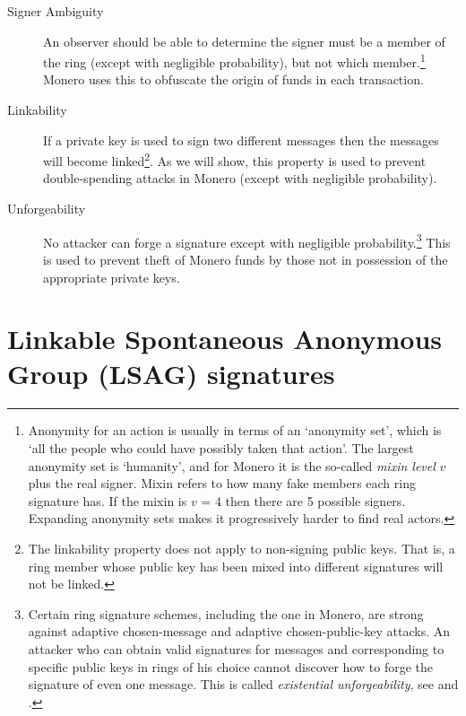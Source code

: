 \begin{description}
	
	\item[Signer Ambiguity]
	An observer should be able to determine the signer must be a member of the ring (except with negligible probability), but not which member.\footnote{\label{anonymity_note}Anonymity for an action is usually in terms of an `anonymity set’, which is `all the people who could have possibly taken that action’. The largest anonymity set is `humanity’, and for Monero it is the so-called {\em mixin level} $v$ plus the real signer. Mixin refers to how many fake members each ring signature has. If the mixin is $v$ = 4 then there are 5 possible signers. Expanding anonymity sets makes it progressively harder to find real actors.} Monero uses this to obfuscate the origin of funds in each transaction.
		
	\item[Linkability] 
	If a private key is used to sign two different messages then the messages will become linked\footnote{\label{linkability_note}The linkability property does not apply to non-signing public keys. That is, a ring member whose public key has been mixed into different signatures will not be linked.}. As we will show, this property is used to prevent double-spending attacks in Monero (except with negligible probability).
	 
	\item[Unforgeability]
    No attacker can forge a signature except with negligible probability.\footnote{\label{unforgeability_note}Certain ring signature schemes, including the one in Monero, are strong against adaptive chosen-message and adaptive chosen-public-key attacks. An attacker who can obtain valid signatures for messages and corresponding to specific public keys in rings of his choice cannot discover how to forge the signature of even one message. This is called {\em existential unforgeability}, see \cite{ledger34} and \cite{Liu2004}.} This is used to prevent theft of Monero funds by those not in possession of the appropriate private keys.
	
\end{description}




\section{Linkable Spontaneous Anonymous Group (LSAG) signatures}
\label{LSAG_section}

